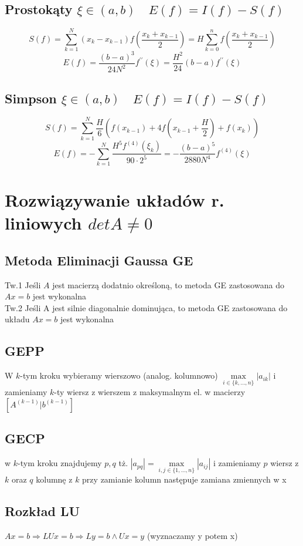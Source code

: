 \documentclass[twocolumn]{article}
\begin{document}
\begin{flushleft}
\subsection{Prostokąty $\xi \in \left(a,b\right) \quad E(f) = I(f) - S(f)$}
$$S(f) = \sum_{k=1}^{N}(x_k - x_{k-1})f\left(\frac{x_k + x_{k-1}}{2}\right) = H\sum_{k=0}^{n}f\left(\frac{x_k + x_{k-1}}{2}\right)$$
$$E(f) = \frac{(b-a)^3}{24N^2}f^{\prime\prime}(\xi) = \frac{H^2}{24}(b-a) f^{\prime\prime}(\xi)$$
\subsection{Simpson $\xi \in \left(a,b\right) \quad E(f) = I(f) - S(f)$}
$$S(f) = \sum_{k=1}^N \frac{H}{6} \left(f(x_{k-1})+4f\left(x_{k-1} + \frac{H}{2}\right) + f(x_k)\right)$$
$$E(f)= -\sum_{k=1}^N \frac{H^5f^{(4)}(\xi_k)}{90\cdot2^5} =- \frac{(b-a)^5}{2880N^4}f^{(4)}(\xi) $$%

\section{Rozwiązywanie układów r. liniowych $detA\neq0$}
\subsection{Metoda Eliminacji Gaussa GE}
Tw.1 Jeśli $A$ jest macierzą dodatnio określoną, to metoda GE zastosowana do $Ax=b$ jest wykonalna\\
Tw.2 Jeśli A jest silnie diagonalnie dominująca, to metoda GE zastosowana do układu $Ax=b$ jest wykonalna
\subsection{GEPP}
W $k$-tym kroku wybieramy wierszowo (analog. kolumnowo) $\underset{i \in \{k,\ldots,n\}}{\max}|a_{ik}|$ i zamieniamy $k$-ty wiersz z wierszem z maksymalnym el. w macierzy $[A^{(k-1)}|b^{(k-1)}]$
\subsection{GECP}
w $k$-tym kroku znajdujemy $p,q$ tż. $|a_{pq}| = \underset{i,j \in \{1,\ldots,n\}}{\max}|a_{ij}|$ i zamieniamy $p$ wiersz z $k$ oraz $q$ kolumnę z $k$ przy zamianie kolumn następuje zamiana zmiennych w x
\subsection{Rozkład LU} %
$Ax=b \Rightarrow LUx = b \Rightarrow Ly=b \land Ux=y$ (wyznaczamy y potem x)

\end{flushleft}
\end{document}

